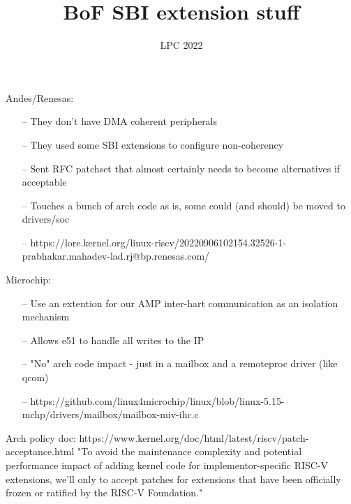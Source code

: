 \documentclass{beamer}
\title{BoF SBI extension stuff}
\author{}
\subtitle{}
\date{LPC 2022}
\begin{document}
\begin{frame}
	\titlepage
\end{frame}

\begin{frame}{}
	Andes/Renesas:
	\begin{itemize}
		\item[--]
		They don't have DMA coherent peripherals
		\item[--]
		They used some SBI extensions to configure non-coherency
		\item[--]
		Sent RFC patchset that almost certainly needs to become alternatives if acceptable
		\item[--]
		Touches a bunch of arch code as is, some could (and should) be moved to drivers/soc
		\item[--]
		https://lore.kernel.org/linux-riscv/20220906102154.32526-1-prabhakar.mahadev-lad.rj@bp.renesas.com/
	\end{itemize}
\end{frame}
\begin{frame}{}
	Microchip:
	\begin{itemize}
		\item[--]
		Use an extention for our AMP inter-hart communication as an isolation mechanism
		\item[--]
		Allows e51 to handle all writes to the IP
		\item[--]
		"No" arch code impact - just in a mailbox and a remoteproc driver (like qcom)
		\item[--]
		https://github.com/linux4microchip/linux/blob/linux-5.15-mchp/drivers/mailbox/mailbox-miv-ihc.c
	\end{itemize}
\end{frame}

\begin{frame}{}
Arch policy doc:
https://www.kernel.org/doc/html/latest/riscv/patch-acceptance.html
"To avoid the maintenance complexity and potential performance impact of adding kernel code for implementor-specific RISC-V extensions, we’ll only to accept patches for extensions that have been officially frozen or ratified by the RISC-V Foundation."
\end{frame}
\end{document}
